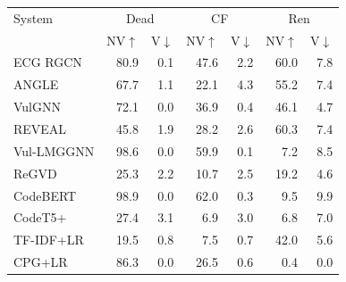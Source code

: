 \begin{tabular}{lrrrrrr}
\toprule
System & \multicolumn{2}{c}{Dead} & \multicolumn{2}{c}{CF} & \multicolumn{2}{c}{Ren} \\
 & NV$\uparrow$ & V$\downarrow$ & NV$\uparrow$ & V$\downarrow$ & NV$\uparrow$ & V$\downarrow$ \\
\midrule
ECG RGCN & 80.9 & 0.1 & 47.6 & 2.2 & 60.0 & 7.8 \\
ANGLE & 67.7 & 1.1 & 22.1 & 4.3 & 55.2 & 7.4 \\
VulGNN & 72.1 & 0.0 & 36.9 & 0.4 & 46.1 & 4.7 \\
REVEAL & 45.8 & 1.9 & 28.2 & 2.6 & 60.3 & 7.4 \\
Vul-LMGGNN & 98.6 & 0.0 & 59.9 & 0.1 & 7.2 & 8.5 \\
ReGVD & 25.3 & 2.2 & 10.7 & 2.5 & 19.2 & 4.6 \\
CodeBERT & 98.9 & 0.0 & 62.0 & 0.3 & 9.5 & 9.9 \\
CodeT5+ & 27.4 & 3.1 & 6.9 & 3.0 & 6.8 & 7.0 \\
TF-IDF+LR & 19.5 & 0.8 & 7.5 & 0.7 & 42.0 & 5.6 \\
CPG+LR & 86.3 & 0.0 & 26.5 & 0.6 & 0.4 & 0.0 \\
\bottomrule
\end{tabular}
